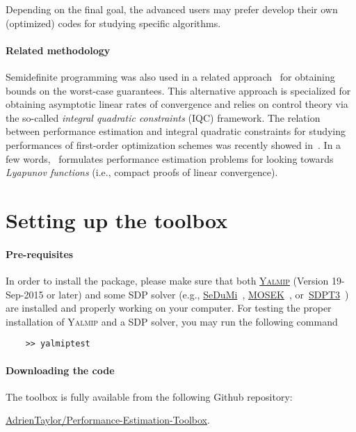 \documentclass[11pt,a4paper]{article}
\begin{document}
	Depending on the final goal, the advanced users may prefer develop their own (optimized) codes for studying specific algorithms.
	\paragraph{Related methodology} Semidefinite programming was also used in a related approach~\cite{lessard2014analysis} for obtaining bounds on the worst-case guarantees. This alternative approach is specialized for obtaining asymptotic linear rates of convergence and relies on control theory via the so-called \emph{integral quadratic constraints} (IQC) framework. The relation between performance estimation and integral quadratic constraints for studying performances of first-order optimization schemes was recently showed in~\cite{taylor2018lyapunov}. In a few words,~\cite{taylor2018lyapunov} formulates performance estimation problems for looking towards \emph{Lyapunov functions} (i.e., compact proofs of linear convergence).

	\clearpage
	\section{Setting up the toolbox}		%


	\paragraph{Pre-requisites} In order to install the package, please make sure that both \href{https://yalmip.github.io/}{\textsc{Yalmip}} (Version 19-Sep-2015 or later) and some SDP solver (e.g., \href{http://sedumi.ie.lehigh.edu/}{SeDuMi}~\cite{Article:Sedumi}, \href{https://mosek.com/}{MOSEK}~\cite{Article:Mosek}, or~\href{http://www.math.nus.edu.sg/~mattohkc/sdpt3.html}{SDPT3}~\cite{Article:sdpt3}) are installed and properly working on your computer. For testing the proper installation of \textsc{Yalmip} and a SDP solver, you may run the following command
	\begin{verbatim}
	>> yalmiptest
	\end{verbatim}
	\paragraph{Downloading the code} The toolbox is fully available from the following {\sc Github} repository: \begin{center}
		\href{https://github.com/AdrienTaylor/Performance-Estimation-Toolbox}{\sc AdrienTaylor/Performance-Estimation-Toolbox}.\\
	\end{center}
\end{document}
